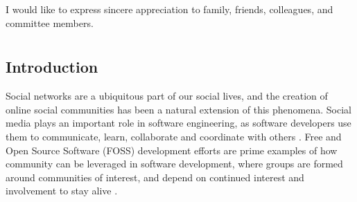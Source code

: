 \documentclass[12pt,letterpaper]{gthesis2}  %
\begin{document}
\indent I would like to express sincere appreciation to family, friends, colleagues, and committee members.
%
%
%
%
\clearpage
%
%
\tableofcontents %
%
%
\clearpage
%
%
\listoffigures %
\clearpage
%
%
\listoftables %
\clearpage
%
%
\listofappendices
\clearpage
%
%
%
%
%
%
%
%
%
%
%
%
%
\DisplayTitle \vspace*{2em} \pagestyle{myheadings}
\setcounter{page}{1} \thispagestyle{empty}
%

\chapter{}
\section{Introduction}
\label{introduction}

Social networks are a ubiquitous part of our social lives, and the creation of online social communities has been a natural extension of this phenomena. Social media plays an important role in software engineering, as software developers use them to communicate, learn, collaborate and coordinate with others \cite{Storey}. Free and Open Source Software (FOSS) development efforts are prime examples of how community can be leveraged in software development, where groups are formed around communities of interest, and depend on continued interest and involvement to stay alive \cite{NymanCodeForking}.
\end{document}
